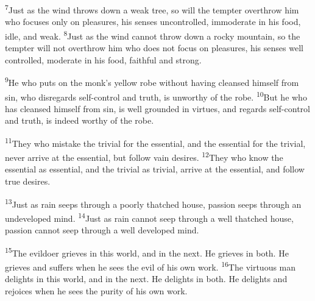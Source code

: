 \documentclass[openany,12pt,english]{book}
\newenvironment{para}{\par\pretolerance=100\tolerance=200\setlength{\emergencystretch}{0.6em}\relax}{\par}
\begin{document}
\begin{para}
    \textsuperscript{7}\thinspace{}Just as the wind throws down a weak tree, so will the temp\-ter o\-ver\-throw him who fo\-cus\-es on\-ly on pleasures, his sen\-ses un\-con\-trolled, im\-mod\-er\-ate in his food, i\-dle, and weak.
    \textsuperscript{8}\thinspace{}Just as the wind can\-not throw down a rock\-y moun\-tain, so the temp\-ter will not o\-ver\-throw him who does not fo\-cus on pleasures, his sen\-ses well con\-trolled, mod\-er\-ate in his food, faith\-ful and strong.
\end{para}

\begin{para}
    \textsuperscript{9}\thinspace{}He who puts on the monk's yel\-low robe with\-out hav\-ing cleansed him\-self from sin, who disregards self-control and truth, is un\-wor\-thy of the robe.
    \textsuperscript{10}\thinspace{}But he who has cleansed him\-self from sin, is well grounded in vir\-tues, and regards self-control and truth, is in\-deed wor\-thy of the robe.
\end{para}

\begin{para}
    \textsuperscript{11}\thinspace{}They who mis\-take the triv\-i\-al for the es\-sen\-tial, and the es\-sen\-tial for the triv\-i\-al, nev\-er ar\-rive at the es\-sen\-tial, but fol\-low vain desires.
    \textsuperscript{12}\thinspace{}They who know the es\-sen\-tial as es\-sen\-tial, and the triv\-i\-al as triv\-i\-al, ar\-rive at the es\-sen\-tial, and fol\-low true desires.
\end{para}

\begin{para}
    \textsuperscript{13}\thinspace{}Just as rain seeps through a poor\-ly tha\-tched house, pas\-sion seeps through an undeveloped mind.
    \textsuperscript{14}\thinspace{}Just as rain can\-not seep through a well tha\-tched house, pas\-sion can\-not seep through a well de\-vel\-oped mind.
\end{para}

\begin{para}
    \textsuperscript{15}\thinspace{}The evil\-do\-er grieves in this world, and in the next. He grieves in both. He grieves and suffers when he sees the evil of his own work.
    \textsuperscript{16}\thinspace{}The vir\-tu\-ous man delights in this world, and in the next. He delights in both. He delights and rejoices when he sees the pu\-ri\-ty of his own work.
\end{para}
\end{document}
